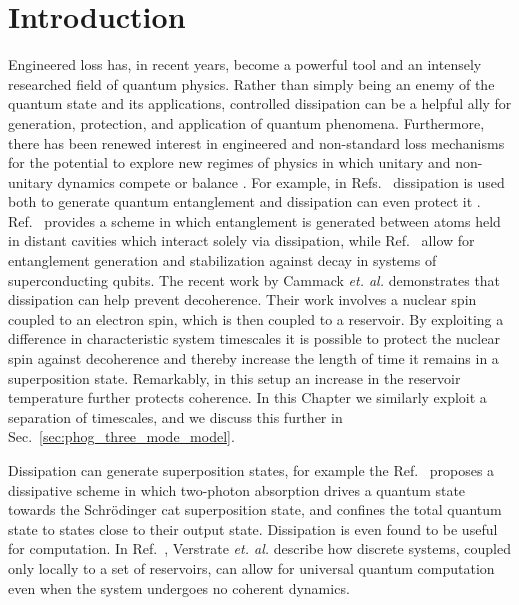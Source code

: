 \section{Introduction}

Engineered loss has, in recent years, become a powerful tool and an intensely researched field of quantum physics. Rather than simply being an enemy of the quantum state and its applications, controlled dissipation can be a helpful ally for generation, protection, and application of quantum phenomena. Furthermore, there has been renewed interest in engineered and non-standard loss mechanisms for the potential to explore new regimes of physics in which unitary and non-unitary dynamics compete or balance \cite{Ozawa2018a, Lieu2018}. For example, in Refs.~\cite{Wolinsky1988, Braun2002, Clark2003, Roghani2018} dissipation is used both to generate quantum entanglement and dissipation can even protect it \cite{Zanardi1997}. Ref.~\cite{Clark2003} provides a scheme in which entanglement is generated between atoms held in distant cavities which interact solely via dissipation, while Ref.~\cite{Kimchi-Schwartz2016} allow for entanglement generation and stabilization against decay in systems of superconducting qubits. %
The recent work by Cammack \emph{et. al.} \cite{Cammack2018} demonstrates that dissipation can help prevent decoherence. Their work involves a nuclear spin coupled to an electron spin, which is then coupled to a reservoir. By exploiting a difference in characteristic system timescales it is possible to protect the nuclear spin against decoherence and thereby increase the length of time it remains in a superposition state. Remarkably, in this setup an increase in the reservoir temperature further protects coherence. In this Chapter we similarly exploit a separation of timescales, and we discuss this further in Sec.~\ref{sec:phog_three_mode_model}.

Dissipation can generate superposition states, for example the Ref.~\cite{Leghtas2015} proposes a dissipative scheme in which two-photon absorption drives a quantum state towards the Schr{\"o}dinger cat superposition state, and confines the total quantum state to states close to their output state. Dissipation is even found to be useful for computation. In Ref.~\cite{Verstraete2009}, Verstrate \emph{et. al.} describe how discrete systems, coupled only locally to a set of reservoirs, can allow for universal quantum computation even when the system undergoes no coherent dynamics.


